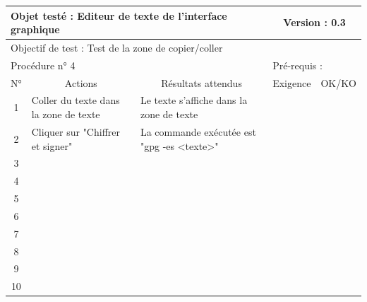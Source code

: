 \documentclass{../res/univ-projet}
\begin{document}
\begin{center}
    \begin{tabular}{|c|p{5cm}|p{5cm}|p{1.5cm}|p{1.5cm}|}
      \hline
      \multicolumn{3}{|l|}{Objet testé : Editeur de texte de l'interface graphique} & \multicolumn{2}{c|}{Version : 0.3}\\ \hline
      \multicolumn{5}{|l|}{Objectif de test : Test de la zone de copier/coller}\\ \hline
      \multicolumn{3}{|l|}{Procédure n° 4} & \multicolumn{2}{p{3cm}|}{Pré-requis : }\\ \hline
      \multicolumn{1}{|c|}{N°} & \multicolumn{1}{c|}{Actions} & \multicolumn{1}{c|}{Résultats attendus} & 
      \multicolumn{1}{c|}{Exigence} & \multicolumn{1}{c|}{OK/KO}\\ \hline
      1 & Coller du texte dans la zone de texte & Le texte s'affiche dans la zone de texte &  & \\
      2 & Cliquer sur "Chiffrer et signer" & La commande exécutée est "gpg -es <texte>" &  & \\
      3 &  &  &  & \\ 
	  4 &  &  &  & \\
      5 &  &  &  & \\
	  6 &  &  &  & \\
      7 &  &  &  & \\
      8 &  &  &  & \\
      9 &  &  &  & \\
      10 &  &  &  &\\ 
	\hline
    \end{tabular}
    \vskip 2.2cm




\end{center}
\end{document}
